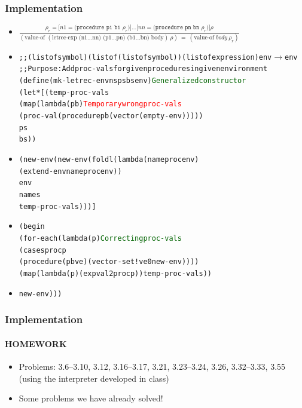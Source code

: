 \documentclass{beamer}
\newcommand{\arrow}{\(\rightarrow\)}
\begin{document}
\begin{frame}[fragile]
\frametitle{Implementation}
\begin{scriptsize}
\begin{itemize}
\item<1->
$\frac{\rho_r = \texttt{[}n1=\texttt{(procedure p1 b1 }\rho_r)\texttt{]}\ldots \texttt{[}nn=\texttt{(procedure pn bn }\rho_r)\texttt{]}\rho}
      {(\text{value-of } (\text{letrec-exp (n1\ldots nn) (p1\ldots pn) (b1\ldots bn) body}) \ \rho) \ = \ (\text{value-of } body \ \rho_r)}$

\item<2->
\begin{alltt}

;; (listof symbol) (listof (listof symbol)) (listof expression) env \arrow{} env
;; Purpose: Add proc-vals for given procedures in given environment
(define (mk-letrec-env ns ps bs env) \textcolor{darkgreen}{Generalized constructor}
  (let* [(temp-proc-vals
           (map (lambda (p b)           \textcolor{red}{Temporary wrong proc-vals}
                  (proc-val (procedure p b (vector (empty-env)))))
                ps
                bs))
\end{alltt}

\item<3->
\begin{alltt}
         (new-env (new-env (foldl (lambda (name proc env)
                                    (extend-env name proc env))
                           env
                           names
                           temp-proc-vals)))]
\end{alltt}

\item<4->
\begin{alltt}
    (begin
      (for-each (lambda (p)   \textcolor{darkgreen}{Correcting proc-vals}
                 (cases proc p
                  (procedure (p b ve) (vector-set! ve 0 new-env))))
                (map (lambda (p) (expval2proc p)) temp-proc-vals))
\end{alltt}

\item<5->
\begin{alltt}
      new-env)))
\end{alltt}

\end{itemize}
\end{scriptsize}
\end{frame}

\begin{frame}[fragile]
\frametitle{Implementation}
\framesubtitle{HOMEWORK}
\begin{scriptsize}
\begin{itemize}
\item<1-> Problems: 3.6--3.10, 3.12, 3.16--3.17, 3.21, 3.23--3.24, 3.26, 3.32--3.33, 3.55 (using the interpreter developed in class)
    
\item<1-> Some problems we have already solved!


\end{itemize}
\end{scriptsize}
\end{frame}
\end{document}
